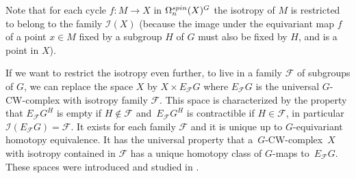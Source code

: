 \documentclass[11pt]{article}
\numberwithin{equation}{section}
\numberwithin{equation}{section}
\begin{document}
	\begin{Remark}
		Note that for each cycle $f\colon M\to X$ in $\Omega_n^{\rm spin}(X)^G$ the
		isotropy of $M$ is restricted to belong to the family $\mathcal{I}(X)$
		(because the image under the equivariant map $f$ of a point $x\in M$ fixed by a subgroup $H$ of
		$G$ must also be fixed by $H$, and is a point in $X$).
		
		If we want to restrict the isotropy even further, to live in a family
		$\mathcal{F}$ of subgroups of $G$, we can replace the space $X$ by $X\times
		E_{\mathcal{F}}G$ where $E_{\mathcal{F}}G$ is the universal $G$-CW-complex
		with isotropy family $\mathcal{F}$. This space is characterized by the property
		that $E_{\mathcal{F}}G^H$ is empty if $H\notin \mathcal{F}$ and~$E_{\mathcal{F}}G^H$ is contractible if $H\in\mathcal{F}$, in particular $\mathcal{I}(E_{\mathcal{F}}G)=\mathcal{F}$. It exists for
		each family $\mathcal{F}$ and it is unique up to $G$-equivariant homotopy
		equivalence. It has the universal property that a~$G$-CW-complex~$X$ with
		isotropy contained in $\mathcal{F}$ has a unique homotopy class of $G$-maps
		to~$E_{\mathcal{F}}G$. These spaces were introduced and studied in \cite{tomDieck,ttd}.
	\end{Remark}
\end{document}
